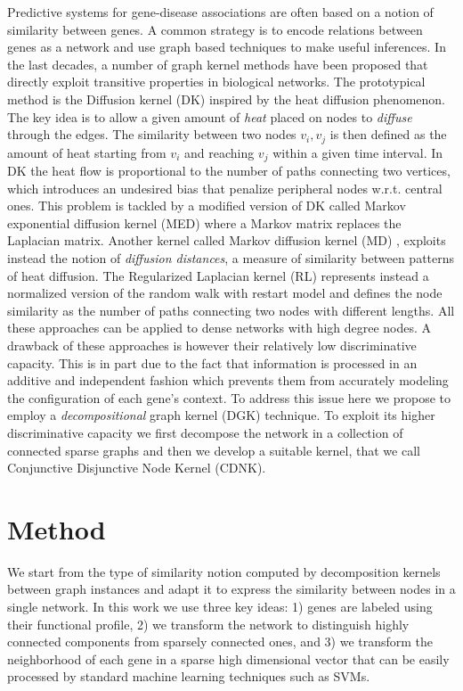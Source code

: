 \documentclass{esannV2}
\begin{document}
Predictive systems for gene-disease associations are often based on a notion
of similarity between genes. A common strategy is to encode relations between
genes as a network and use graph based techniques to make useful inferences.
In the last decades, a number of graph kernel methods have been proposed that
directly exploit transitive properties in biological networks. The
prototypical method is the Diffusion kernel (DK) \cite{ledk} inspired by the
heat diffusion phenomenon. The key idea is to allow a given amount of {\em
heat} placed on nodes to {\em diffuse} through the edges. The similarity
between two nodes $v_{i}, v_{j}$ is then defined as the amount of heat
starting from $v_{i}$ and reaching $v_{j}$ within a given time interval. In DK
the heat flow is proportional to the number of paths connecting two vertices,
which introduces an undesired bias that penalize peripheral nodes w.r.t.
central ones. This problem is tackled by a modified version of DK called
Markov exponential diffusion kernel (MED) \cite{medk} where a Markov matrix
replaces the Laplacian matrix.  Another kernel called Markov diffusion kernel
(MD) \cite{mdk}, exploits instead the notion of {\em diffusion distances}, a
measure of similarity between patterns of heat diffusion. The Regularized
Laplacian kernel (RL) \cite{rlk} represents instead a normalized version of
the random walk with restart model and defines the node similarity as the
number of paths connecting two nodes with different lengths. All these
approaches can be applied to dense networks with high degree nodes. A drawback
of these approaches is however their relatively low discriminative capacity.
This is in part due to the fact that information is processed in an additive
and independent fashion which prevents them from accurately modeling the
configuration of each gene's context. To address this issue here we propose to
employ a {\em decompositional} graph kernel (DGK) \cite{covolution_kernel}
technique. To exploit its higher discriminative capacity we first decompose
the network in a collection of connected sparse graphs and then we develop a
suitable kernel, that we call Conjunctive Disjunctive Node Kernel (CDNK).


\section{Method}\label{method} 

We start from the type of similarity notion computed by decomposition kernels
between graph instances and adapt it to express the similarity between nodes
in a single network. In this work we use three key ideas: 1) genes are labeled
using their functional profile, 2) we transform the network to distinguish
highly connected components from sparsely connected ones, and 3) we transform
the neighborhood of each gene in a sparse high dimensional vector that can be
easily processed by standard machine learning techniques such as SVMs.
\end{document}
